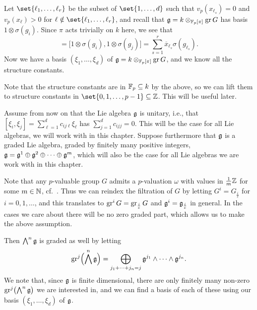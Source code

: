 Let $\set{\ell_{1},\dotsc,\ell_{r}}$ be the subset of $\set{1,\dotsc,d}$ such that $v_{p}(x_{\ell_{s}}) = 0$ and $v_{p}(x_{\ell}) > 0$ for $\ell \notin \set{\ell_{1},\dotsc,\ell_{r}}$, and recall that $\mathfrak{g} = k \otimes_{\mathbb{F}_{p}[\pi]} \operatorname{gr} G$ has basis $1 \otimes \sigma(g_{i})$. Since $\pi$ acts trivially on $k$ here, we see that
\begin{equation*}
  [\xi_{i},\xi_{j}] = \bigl[ 1\otimes\sigma(g_{i}),1\otimes\sigma(g_{j}) \bigr] = \sum_{s=1}^{r} \overline{x}_{\ell_{s}} \sigma(g_{\ell_{s}}).
\end{equation*}
Now we have a basis $(\xi_{1},\dotsc,\xi_{d})$ of $\mathfrak{g} = k \otimes_{\mathbb{F}_{p}[\pi]} \operatorname{gr} G$, and we know all the structure constants.

\begin{remark}\label{rem:struc-consts-lift}
  Note that the structure constants are in $\mathbb{F}_{p} \subseteq k$ by the above, so we can lift them to structure constants in $\set{0,1,\dotsc,p-1} \subseteq \Z$. This will be useful later.
\end{remark}

Assume from now on that the Lie algebra $\mathfrak{g}$ is unitary, i.e., that $[\xi_{i},\xi_{j}] = \sum_{\ell=1}^{d} c_{ij\ell} \xi_{\ell}$ has $\sum_{j=1}^{d} c_{ijj} = 0$. This will be the case for all Lie algebras, we will work with in this chapter. Suppose furthermore that $\mathfrak{g}$ is a graded Lie algebra, graded by finitely many positive integers, $\mathfrak{g} = \mathfrak{g}^{1} \oplus \mathfrak{g}^{2} \oplus \dotsb \oplus \mathfrak{g}^{m}$, which will also be the case for all Lie algebras we are work with in this chapter.

\begin{remark}\label{rem:g-Z-grading}
  Note that any $p$-valuable group $G$ admits a $p$-valuation $\omega$ with values in $\frac{1}{m}\mathbb{Z}$ for some $m \in \mathbb{N}$, cf.\ \cite[Cor.~33.3]{Sch}. Thus we can reindex the filtration of $G$ by letting $G^{i} = G_{\frac{i}{e}}$ for $i=0,1,\dotsc$, and this translates to $\operatorname{gr}^{i} G = \operatorname{gr}_{\frac{i}{e}} G$ and $\mathfrak{g}^{i} = \mathfrak{g}_{\frac{i}{e}}$ in general. In the cases we care about there will be no zero graded part, which allows us to make the above assumption.
\end{remark}

Then $\bigwedge^{n} \mathfrak{g}$ is graded as well by letting
\begin{equation*}
  \operatorname{gr}^{j}\Bigl( \bigwedge^{n}\mathfrak{g} \Bigr) = \bigoplus_{j_{1} + \dotsb + j_{n} = j} \mathfrak{g}^{j_{1}} \wedge \dotsb \wedge \mathfrak{g}^{j_{n}}.
\end{equation*}
We note that, since $\mathfrak{g}$ is finite dimensional, there are only finitely many non-zero $\operatorname{gr}^{j}\bigl( \bigwedge^{n} \mathfrak{g} \bigr)$ we are interested in, and we can find a basis of each of these using our basis $(\xi_{1},\dotsc,\xi_{d})$ of $\mathfrak{g}$.

